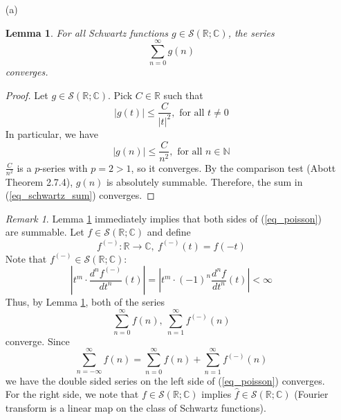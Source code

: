 \documentclass[12pt, reqno]{article}
\newtheorem{lemma}[theorem]{Lemma}
\theoremstyle{definition}
\theoremstyle{remark}
\newtheorem{remark}[theorem]{Remark}
\begin{document}
\begin{itemize}
\item[(a)]

\begin{lemma} \label{lm_schwartz_sum}
    For all Schwartz functions $g\in\mathcal{S}(\mathbb{R;C})$, the series 
    \begin{equation} \label{eq_schwartz_sum}
        \sum_{n=0}^{\infty}g(n)
    \end{equation}
    converges.
\end{lemma}

\begin{proof}
    Let $g\in\mathcal{S}(\mathbb{R};\mathbb{C})$. Pick $C\in \mathbb{R}$ such that $$
|g(t)|\le \frac{C}{|t|^{2}},\text{ for all }t\ne0
$$
In particular, we have $$
|g(n)|\le \frac{C}{n^{2}},\text{ for all }n\in \mathbb{N}
$$
$\frac{C}{n^{2}}$ is a $p$-series with $p=2>1$, so it converges. By the comparison test (Abott Theorem 2.7.4), $g(n)$ is absolutely summable. Therefore, the sum in (\ref{eq_schwartz_sum}) converges.
\end{proof}

\begin{remark} \label{rm_double_sum}
    Lemma \ref{lm_schwartz_sum} immediately implies that both sides of (\ref{eq_poisson}) are summable. Let $f\in \mathcal{S}(\mathbb{R};\mathbb{C})$ and define $$f^{(-)}:\mathbb{R}\rightarrow \mathbb{C},~f^{(-)}(t)=f(-t)$$
Note that $f^{(-)}\in \mathcal{S}(\mathbb{R};\mathbb{C})$: $$
\left|t^{m}\cdot \frac{d^{n}f^{(-)}}{dt^{n}}(t)\right|= \left|t^{m}\cdot(-1)^{n} \frac{d^{n}f}{dt^{n}}(t)\right|<\infty
$$
Thus, by Lemma \ref{lm_schwartz_sum}, both of the series $$
\sum_{n=0}^{\infty}f(n),~\sum_{n=1}^{\infty}f^{(-)}(n)
$$
converge. Since $$
\sum_{n=-\infty}^{\infty}f(n)=\sum_{n=0}^{\infty}f(n)+\sum_{n=1}^{\infty}f^{(-)}(n)
$$we have the double sided series on the left side of (\ref{eq_poisson}) converges. For the right side, we note that $f\in\mathcal{S}(\mathbb{R};\mathbb{C})$ implies $\widehat f\in\mathcal{S}(\mathbb{R};\mathbb{C})$ (Fourier transform is a linear map on the class of Schwartz functions). 
\end{remark}



\end{itemize}
\end{document}
